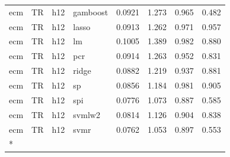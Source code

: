 \begin{ThreePartTable}
\begin{longtable}[t]{llclcccc}
ecm & TR & h12 & gamboost & 0.0921 & 1.273 & 0.965 & 0.482\\
ecm & TR & h12 & lasso & 0.0913 & 1.262 & 0.971 & 0.957\\
ecm & TR & h12 & lm & 0.1005 & 1.389 & 0.982 & 0.880\\
ecm & TR & h12 & pcr & 0.0914 & 1.263 & 0.952 & 0.831\\
ecm & TR & h12 & ridge & 0.0882 & 1.219 & 0.937 & 0.881\\
ecm & TR & h12 & sp & 0.0856 & 1.184 & 0.981 & 0.905\\
ecm & TR & h12 & spi & 0.0776 & 1.073 & 0.887 & 0.585\\
ecm & TR & h12 & svmlw2 & 0.0814 & 1.126 & 0.904 & 0.838\\
ecm & TR & h12 & svmr & 0.0762 & 1.053 & 0.897 & 0.553\\*
\end{longtable}
\end{ThreePartTable}
\endgroup{}

